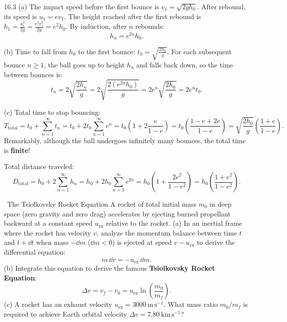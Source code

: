 \begin{tabletworkspace}[6.0cm]
\end{tabletworkspace}

\begin{solution}{16.3}
(a) The impact speed before the first bounce is $v_1 = \sqrt{2gh_0}$.
After rebound, its speed is $u_1 = e v_1$.
The height reached after the first rebound is $h_1 = \frac{u_1^2}{2g} = \frac{e^2 v_1^2}{2g} = e^2 h_0$.
By induction, after $n$ rebounds:
\[
\boxed{h_n = e^{2n}h_0.}
\]

(b) Time to fall from $h_0$ to the first bounce: $t_0 = \sqrt{\frac{2h_0}{g}}$.
For each subsequent bounce $n \ge 1$, the ball goes up to height $h_n$ and falls back down, so the time between bounces is:
\[
t_n = 2\sqrt{\frac{2h_n}{g}} = 2\sqrt{\frac{2(e^{2n}h_0)}{g}} = 2e^n\sqrt{\frac{2h_0}{g}} = 2e^n t_0.
\]

(c) Total time to stop bouncing:
\[
T_{\text{total}} = t_0 + \sum_{n=1}^\infty t_n = t_0 + 2t_0\sum_{n=1}^\infty e^n = t_0\left( 1 + 2\frac{e}{1 - e} \right) = t_0\left(\frac{1 - e + 2e}{1 - e}\right) = \boxed{\sqrt{\frac{2h_0}{g}}\left(\frac{1 + e}{1 - e}\right).}
\]
Remarkably, although the ball undergoes infinitely many bounces, the total time is \textbf{finite}!

Total distance traveled:
\[
D_{\text{total}} = h_0 + 2\sum_{n=1}^\infty h_n = h_0 + 2h_0\sum_{n=1}^\infty e^{2n} = h_0\left( 1 + \frac{2e^2}{1 - e^2} \right) = \boxed{h_0\left(\frac{1 + e^2}{1 - e^2}\right).}
\]
\end{solution}

\begin{exercise}{\core\ The Tsiolkovsky Rocket Equation}
A rocket of total initial mass $m_0$ in deep space (zero gravity and zero drag) accelerates by ejecting burned propellant backward at a constant speed $u_{\text{ex}}$ relative to the rocket.
(a) In an inertial frame where the rocket has velocity $v$, analyze the momentum balance between time $t$ and $t + \dd t$ when mass $-\dd m$ ($\dd m < 0$) is ejected at speed $v - u_{\text{ex}}$ to derive the differential equation:
\[
m\,\dd v = -u_{\text{ex}}\,\dd m.
\]
(b) Integrate this equation to derive the famous \textbf{Tsiolkovsky Rocket Equation}:
\[
\Delta v = v_f - v_0 = u_{\text{ex}}\ln\left(\frac{m_0}{m_f}\right).
\]
(c) A rocket has an exhaust velocity $u_{\text{ex}} = 3000\ \mathrm{m\,s^{-1}}$. What mass ratio $m_0/m_f$ is required to achieve Earth orbital velocity $\Delta v = 7.80\ \mathrm{km\,s^{-1}}$?
\end{exercise}

